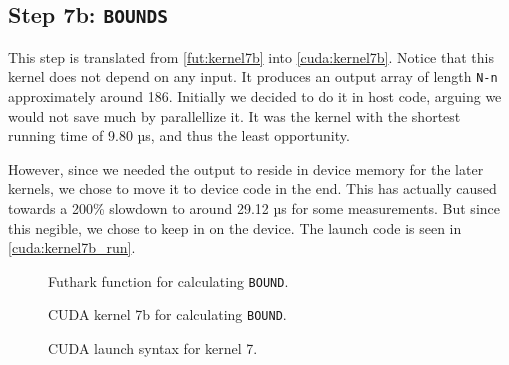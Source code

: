 \subsection{
    Step 7b: \texttt{BOUNDS}
}

This step is translated from \autoref{fut:kernel7b} into \autoref{cuda:kernel7b}.
Notice that this kernel does not
depend on any input. It produces an output array of length \texttt{N-n}
approximately around 186. Initially we decided to do it in host code, arguing we
would not save much by parallellize it. It was the kernel with the shortest
running time of 9.80 µs, and thus the least opportunity.

However, since we needed the output to reside in device memory for the later
kernels, we chose to move it to device code in the end. This has actually caused
towards a 200\% slowdown to around 29.12 µs for some measurements.  But since
this negible, we chose to keep in on the device.  The launch code is seen in
\autoref{cuda:kernel7b_run}.


\begin{figure}[H]
    \centering
    \caption{Futhark function for calculating \texttt{BOUND}.}
    \label{fut:kernel7b}
\end{figure}

\begin{figure}[H]
    \centering
    \caption{CUDA kernel 7b for calculating  \texttt{BOUND}.}
    \label{cuda:kernel7b}
\end{figure}

\begin{figure}[H]
    \centering
    \caption{CUDA launch syntax for kernel 7.}
    \label{cuda:kernel7b_run}
\end{figure}

